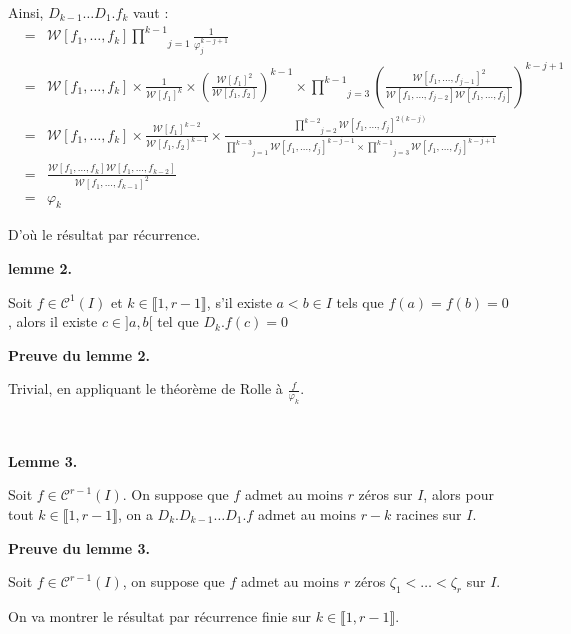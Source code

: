 Ainsi, $D_{k - 1} \ldots D_1 .f_k $ vaut :
\begin{eqnarray*}
  & = & \mathcal{W} [f_1, \ldots, f_k] \underset{j = 1}{\overset{k -
  1}{\prod}} \frac{1}{\varphi^{k - j + 1}_j} \\
  & = & \mathcal{W} [f_1, \ldots, f_k] \times \frac{1}{\mathcal{W} [f_1]^k}
  \times \left( \frac{\mathcal{W}[f_1]^2}{\mathcal{W}[f_1, f_2]} \right)^{k -
  1} \times  \underset{j = 3}{ \overset{k - 1}{\prod}} \left(
  \frac{\mathcal{W}[f_1, \ldots, f_{j - 1}]^2}{\mathcal{W}[f_1, \ldots, f_{j -
  2}]\mathcal{W}[f_1, \ldots, f_j]} \right)^{k - j + 1}\\
  & = & \mathcal{W} [f_1, \ldots, f_k] \times \frac{\mathcal{W} [f_1]^{k -
  2}}{\mathcal{W} [f_1, f_2]^{k - 1}} \times \frac{\underset{j = 2}{
  \overset{k - 2}{\prod}} \mathcal{W} [f_1, \ldots, f_j]^{2 (k -
  j)}}{\underset{j = 1}{ \overset{k - 3}{\prod}} \mathcal{W} [f_1, \ldots,
  f_j]^{k - j - 1} \times \underset{j = 3}{ \overset{k - 1}{\prod}}
  \mathcal{W} [f_1, \ldots, f_j]^{k - j + 1}}\\
  & = & \frac{\mathcal{W} [f_1, \ldots, f_k] \mathcal{W} [f_1, \ldots, f_{k -
  2}]}{\mathcal{W} [f_1, \ldots, f_{k - 1}]^2}\\
  & = & \varphi_k
\end{eqnarray*}

D'o{\`u} le r{\'e}sultat par r{\'e}currence.

\textbf{lemme 2.}

Soit $f \in \mathcal{C}^1 (I)$ et $k \in \llbracket 1, r - 1 \rrbracket$, s'il
existe $a < b \in I$ tels que $f (a) = f (b) = 0$, alors il existe $c \in] a,
b [$ tel que $D_k .f (c) = 0$

\textbf{Preuve du lemme 2.}

Trivial, en appliquant le th{\'e}or{\`e}me de Rolle {\`a}
$\frac{f}{\varphi_k}$.

\

\textbf{Lemme 3.}

Soit $f \in \mathcal{C}^{r - 1} (I)$. On suppose que $f$ admet au moins $r$
z{\'e}ros sur $I$, alors pour tout $k \in \llbracket 1, r - 1 \rrbracket$, on
a $D_k .D_{k - 1} \ldots D_1 .f$ admet au moins $r - k$ racines sur $I$.

\textbf{Preuve du lemme 3.}

Soit $f \in \mathcal{C}^{r - 1} (I)$, on suppose que $f$ admet au moins $r$
z{\'e}ros $\zeta_1 < \ldots < \zeta_r $ sur $I$.

On va montrer le r{\'e}sultat par r{\'e}currence finie sur $k \in \llbracket
1, r - 1 \rrbracket$.

